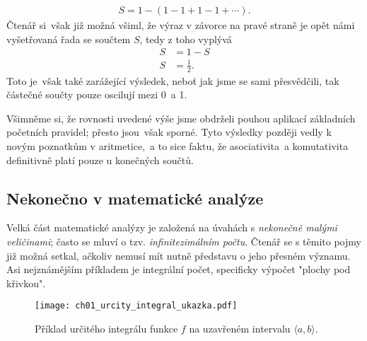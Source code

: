 \begin{align*}
S=1-(1-1+1-1+\cdots ) .
\end{align*}
Čtenář si~však již možná všiml, že výraz v závorce na pravé straně je opět námi vyšetřovaná řada se součtem $S$, tedy z toho vyplývá
\begin{align*}
S&=1-S\\
S&=\frac{1}{2} .
\end{align*}
Toto je~však také zarážející výsledek, neboť jak jsme se sami přesvědčili, tak částečné součty pouze oscilují mezi 0~a 1.\par
Všimněme si, že rovnosti uvedené výše jsme obdrželi pouhou aplikací základních početních pravidel; přesto jsou~však sporné. Tyto výsledky později vedly k novým poznatkům v aritmetice,~a to sice faktu, že asociativita~a komutativita definitivně platí pouze u konečných součtů.

\subsection{Nekonečno v matematické analýze}

Velká část matematické analýzy je založená na úvahách s \emph{nekonečně malými veličinami}; často se mluví o tzv. \emph{infinitezimálním počtu}. Čtenář se s těmito pojmy již možná setkal, ačkoliv nemusí mít nutně představu o jeho přesném významu. Asi nejznámějším příkladem je integrální počet, specificky výpočet "plochy pod křivkou".
\begin{figure}[H]
	\centering
	\texttt{[image: ch01\_urcity\_integral\_ukazka.pdf]}
	\caption{Příklad určitého integrálu funkce $f$ na uzavřeném intervalu $\langle a,b \rangle$.}
	\label{fig:urcity_integral_ukazka}
\end{figure}

